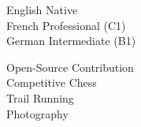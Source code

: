 {\fontsize{8.5pt}{13.0pt}\selectfont\color{textmuted}%
English Native\\
French Professional (C1)\\
German Intermediate (B1)}\par

\resumedivider

{\fontsize{8.5pt}{13.0pt}\selectfont\color{textmuted}%
Open-Source Contribution\\
Competitive Chess\\
Trail Running\\
Photography}\par
